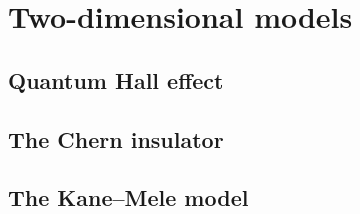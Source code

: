 \section{Two-dimensional models}

\subsection{Quantum Hall effect}

\subsection{The Chern insulator}\label{sec:Chern}

\subsection{The Kane--Mele model}


